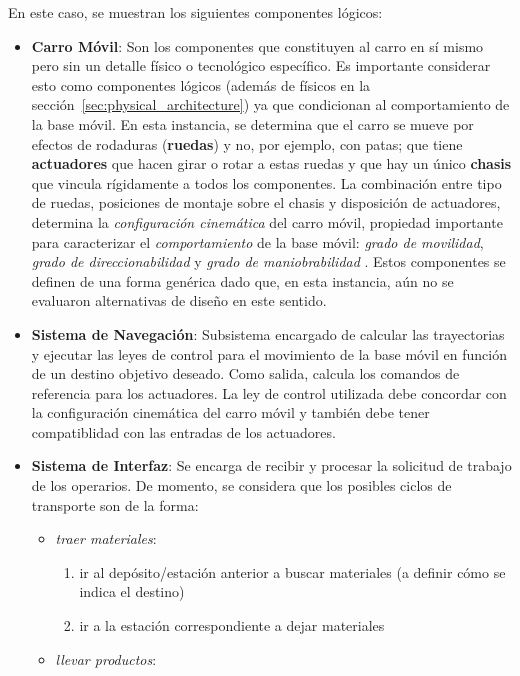 En este caso, se muestran los siguientes componentes lógicos:
\begin{itemize}
	\item \textbf{Carro Móvil}: Son los componentes  que constituyen al carro en sí mismo pero sin un detalle físico o tecnológico específico. Es importante considerar esto como componentes lógicos (además de físicos en la sección~\ref{sec:physical_architecture}) ya que condicionan al comportamiento de la base móvil. En esta instancia, se determina que el carro se mueve por efectos de rodaduras (\textbf{ruedas}) y no, por ejemplo, con patas; que tiene \textbf{actuadores} que hacen girar o rotar a estas ruedas y que hay un único \textbf{chasis} que vincula rígidamente a todos los componentes. La combinación entre tipo de ruedas, posiciones de montaje sobre el chasis y disposición de actuadores, determina la \emph{configuración cinemática} del carro móvil, propiedad importante para caracterizar el \emph{comportamiento} de la base móvil: \emph{grado de movilidad}, \emph{grado de direccionabilidad} y \emph{grado de maniobrabilidad} \cite{canudas_de_wit_theory_1996}. Estos componentes se definen de una forma genérica dado que, en esta instancia, aún no se evaluaron alternativas de diseño en este sentido.
	\item \textbf{Sistema de Navegación}: Subsistema encargado de calcular las trayectorias y ejecutar las leyes de control para el movimiento de la base móvil en función de un destino objetivo deseado. Como salida, calcula los comandos de referencia para los actuadores. La ley de control utilizada debe concordar con la configuración cinemática del carro móvil y también debe tener compatiblidad con las entradas de los actuadores.
	\item \textbf{Sistema de Interfaz}: Se encarga de recibir y procesar la solicitud de trabajo de los operarios. De momento, se considera que los posibles ciclos de transporte son de la forma:
	\begin{itemize}
		\item \emph{traer materiales}: 
		\begin{enumerate}
			\item ir al depósito/estación anterior a buscar materiales (a definir cómo se indica el destino)
			\item ir a la estación correspondiente a dejar materiales
		\end{enumerate}
		\item \emph{llevar productos}:
		\begin{enumerate}

\end{enumerate}
\end{itemize}
\end{itemize}
